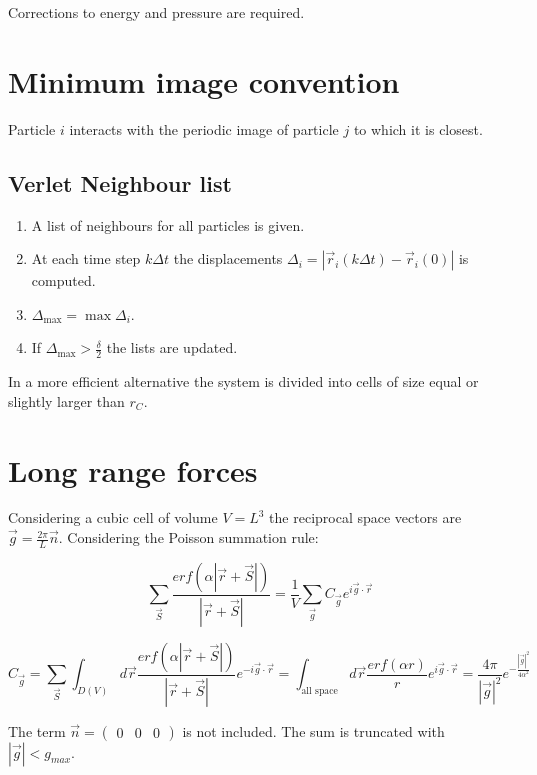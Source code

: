 	Corrections to energy and pressure are required.

\section{Minimum image convention}
Particle $i$ interacts with the periodic image of particle $j$ to which it is closest.

	\subsection{Verlet Neighbour list}

	\begin{multicols}{2}
		\begin{enumerate}
			\item A list of neighbours for all particles is given.
			\item At each time step $k\Delta t$ the displacements $\Delta_i = |\vec{r}_i(k\Delta t) - \vec{r}_i(0)|$ is computed.
			\item $\Delta_{\max} = \max\Delta_i$.
			\item If $\Delta_{\max} > \frac{\delta}{2}$ the lists are updated.
		\end{enumerate}
	\end{multicols}

	In a more efficient alternative the system is divided into cells of size equal or slightly larger than $r_C$.

\section{Long range forces}
Considering a cubic cell of volume $V = L^3$ the reciprocal space vectors are $\vec{g} = \frac{2\pi}{L}\vec{n}$.
Considering the Poisson summation rule:

$$\sum\limits_{\vec{S}}\frac{erf(\alpha|\vec{r} + \vec{S}|)}{|\vec{r}+\vec{S}|} = \frac{1}{V}\sum\limits_{\vec{g}}C_{\vec{g}}e^{i\vec{g}\cdot\vec{r}}$$

$$C_{\vec{g}} = \sum\limits_{\vec{S}}\int_{D(V)} d\vec{r}\frac{erf(\alpha|\vec{r}+\vec{S}|)}{|\vec{r}+\vec{S}|}e^{-i\vec{g}\cdot\vec{r}} = \int_{\text{all space}}d\vec{r}\frac{erf(\alpha r)}{r}e^{i\vec{g}\cdot\vec{r}} = \frac{4\pi}{|\vec{g}|^2}e^{-\frac{|\vec{g}|^2}{4\alpha^2}}$$

The term $\vec{n} = \begin{pmatrix} 0&0&0\end{pmatrix}$ is not included.
The sum is truncated with $|\vec{g}|<g_{max}$.

